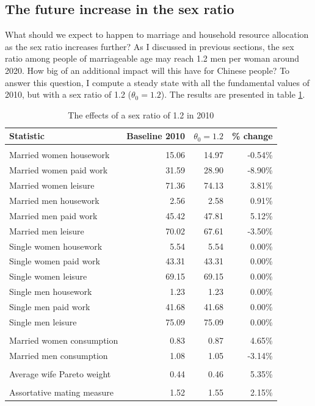 \documentclass[12pt]{article}
\begin{document}
\subsection{The future increase in the sex ratio}

What should we expect to happen to marriage and household resource allocation as the sex ratio increases further? As I discussed in previous sections, the sex ratio among people of marriageable age may reach 1.2 men per woman around 2020. How big of an additional impact will this have for Chinese people? To answer this question, I compute a steady state with all the fundamental values of 2010, but with a sex ratio of 1.2 ($\theta_0=1.2$). The results are presented in table \ref{tab:quant_exp_1}.

\begin{table}[htbp]
	\centering
	\caption{The effects of a sex ratio of 1.2 in 2010}
	\begin{tabular}{lrrr}
		\toprule
		Statistic & \multicolumn{1}{l}{Baseline 2010} & \multicolumn{1}{l}{$\theta_0=1.2$} & \multicolumn{1}{l}{\% change} \\
		\midrule
		&       &       &  \\
		Married women housework & 15.06 & 14.97 & -0.54\% \\
		Married women paid work & 31.59 & 28.90 & -8.90\% \\
		Married women leisure & 71.36 & 74.13 & 3.81\% \\
		Married men housework & 2.56  & 2.58  & 0.91\% \\
		Married men paid work & 45.42 & 47.81 & 5.12\% \\
		Married men leisure & 70.02 & 67.61 & -3.50\% \\
		Single women housework & 5.54  & 5.54  & 0.00\% \\
		Single women paid work & 43.31 & 43.31 & 0.00\% \\
		Single women leisure & 69.15 & 69.15 & 0.00\% \\
		Single men housework & 1.23  & 1.23  & 0.00\% \\
		Single men paid work & 41.68 & 41.68 & 0.00\% \\
		Single men leisure & 75.09 & 75.09 & 0.00\% \\
		&       &       &  \\
		Married women consumption & 0.83  & 0.87  & 4.65\% \\
		Married men consumption & 1.08  & 1.05  & -3.14\% \\
		&       &       &  \\
		Average wife Pareto weight & 0.44  & 0.46  & 5.35\% \\
		&       &       &  \\
		Assortative mating measure & 1.52  & 1.55  & 2.15\% \\
		\bottomrule
		\bottomrule
	\end{tabular}
		\label{tab:quant_exp_1}
	\end{table}
\end{document}
